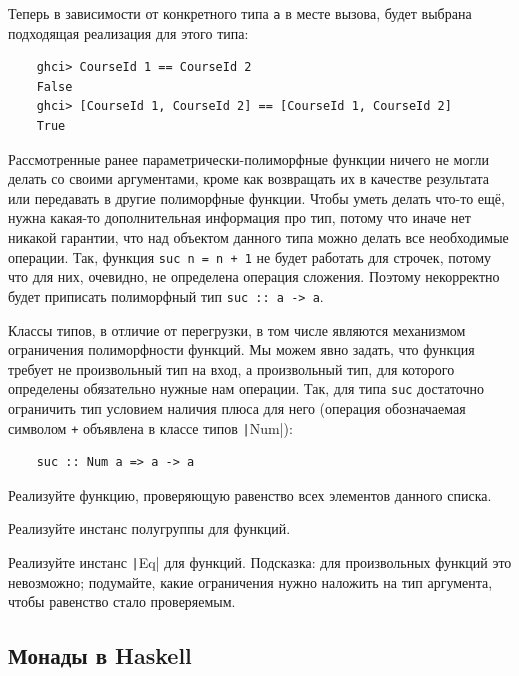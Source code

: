 Теперь в зависимости от конкретного типа \texttt{a} в месте вызова, будет выбрана подходящая реализация для этого типа:
\begin{verbatim}
    ghci> CourseId 1 == CourseId 2
    False
    ghci> [CourseId 1, CourseId 2] == [CourseId 1, CourseId 2]
    True
\end{verbatim}

Рассмотренные ранее параметрически-полиморфные функции ничего не могли делать со своими аргументами, кроме как возвращать их в качестве результата или передавать в другие полиморфные функции.
Чтобы уметь делать что-то ещё, нужна какая-то дополнительная информация про тип, потому что иначе нет никакой гарантии, что над объектом данного типа можно делать все необходимые операции.
Так, функция \texttt{suc n = n + 1} не будет работать для строчек, потому что для них, очевидно, не определена операция сложения.
Поэтому некорректно будет приписать полиморфный тип \texttt{suc :: a -> a}.

Классы типов, в отличие от перегрузки, в том числе являются механизмом ограничения полиморфности функций.
Мы можем явно задать, что функция требует не произвольный тип на вход, а произвольный тип, для которого определены обязательно нужные нам операции.
Так, для типа \texttt{suc} достаточно ограничить тип условием наличия плюса для него (операция обозначаемая символом \texttt{+} объявлена в классе типов \texttt|Num|):
\begin{verbatim}
    suc :: Num a => a -> a
\end{verbatim}

\begin{task}
    Реализуйте функцию, проверяющую равенство всех элементов данного списка.
\end{task}

\begin{task}
    Реализуйте инстанс полугруппы для функций.
\end{task}

\begin{task}
    Реализуйте инстанс \texttt|Eq| для функций.
    Подсказка: для произвольных функций это невозможно; подумайте, какие ограничения нужно наложить на тип аргумента, чтобы равенство стало проверяемым.
\end{task}

\subsection{Монады в Haskell}

